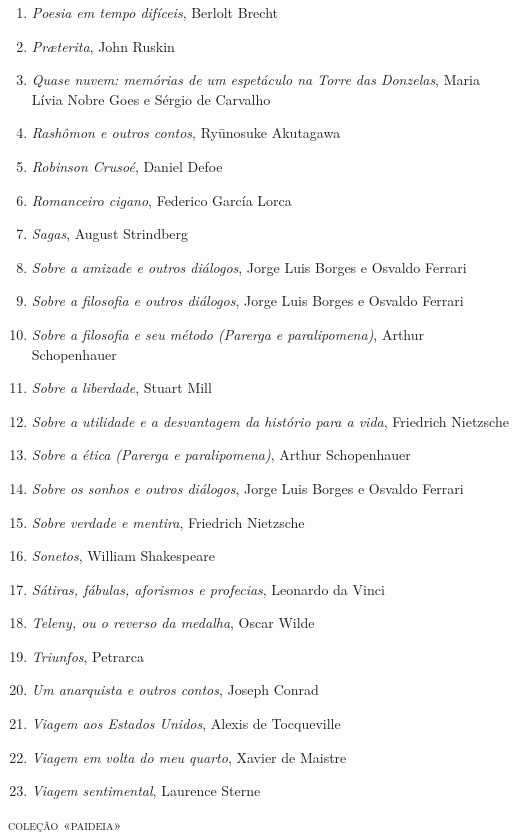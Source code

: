 \begin{enumerate}
\item \textit{Poesia em tempo difíceis}, Berlolt Brecht 
\item \textit{Pr\ae terita}, John Ruskin
\item \textit{Quase nuvem: memórias de um espetáculo na Torre das Donzelas}, Maria Lívia Nobre Goes e Sérgio de Carvalho
\item \textit{Rashômon e outros contos}, Ryūnosuke Akutagawa
\item \textit{Robinson Crusoé}, Daniel Defoe
\item \textit{Romanceiro cigano}, Federico García Lorca
\item \textit{Sagas}, August Strindberg
\item \textit{Sobre a amizade e outros diálogos}, Jorge Luis Borges e Osvaldo Ferrari
\item \textit{Sobre a filosofia e outros diálogos}, Jorge Luis Borges e Osvaldo Ferrari
\item \textit{Sobre a filosofia e seu método (Parerga e paralipomena)}, Arthur Schopenhauer 
\item \textit{Sobre a liberdade}, Stuart Mill
\item \textit{Sobre a utilidade e a desvantagem da histório para a vida}, Friedrich Nietzsche
\item \textit{Sobre a ética (Parerga e paralipomena)}, Arthur Schopenhauer 
\item \textit{Sobre os sonhos e outros diálogos}, Jorge Luis Borges e Osvaldo Ferrari
\item \textit{Sobre verdade e mentira}, Friedrich Nietzsche
\item \textit{Sonetos}, William Shakespeare
\item \textit{Sátiras, fábulas, aforismos e profecias}, Leonardo da Vinci
\item \textit{Teleny, ou o reverso da medalha}, Oscar Wilde
\item \textit{Triunfos}, Petrarca
\item \textit{Um anarquista e outros contos}, Joseph Conrad
\item \textit{Viagem aos Estados Unidos}, Alexis de Tocqueville
\item \textit{Viagem em volta do meu quarto}, Xavier de Maistre 
\item \textit{Viagem sentimental}, Laurence Sterne
\end{enumerate}

\medskip
{\large\textsc{coleção «paideia»}}



